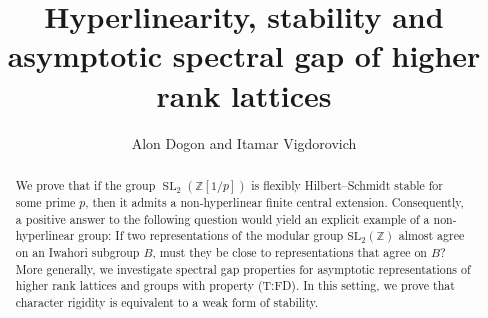 \documentclass[11pt]{amsart}
\title[hyperlinearity, stability and spectral gap]{Hyperlinearity, stability and asymptotic spectral gap of higher rank lattices}
\author{Alon Dogon and Itamar Vigdorovich}
\DeclareMathOperator{\SL}{SL}
\newcommand{\Z}{{\mathbb{Z}}}
\theoremstyle{definition}
\theoremstyle{remark}
\theoremstyle{definition}
\begin{document}
\begin{abstract}
We prove that if the group $\SL_2(\mathbb Z[1/p])$ is flexibly Hilbert--Schmidt stable for some prime $p$, then it admits a non-hyperlinear finite central extension.
Consequently, a positive answer to the following question would yield an explicit example of a non-hyperlinear group: If two  representations of the modular group $\mathrm{SL}_2(\mathbb{Z})$ almost agree on an Iwahori subgroup $B$, %
must they be close to representations that agree on $B$?
More generally, we investigate spectral gap properties for asymptotic representations of higher rank lattices and groups with property (T:FD).
In this setting, we prove that character rigidity is equivalent to a weak form of stability.


    
    

\end{abstract}
\end{document}

